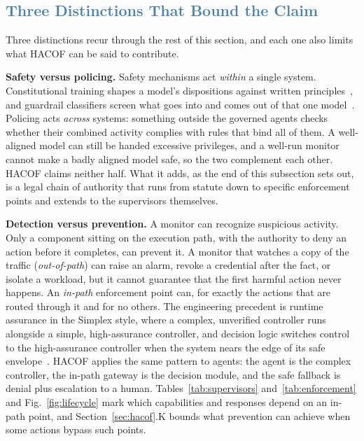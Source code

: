 \documentclass[journal]{IEEEtran}
\newcommand{\hacof}{HACOF}
\begin{document}
\subsection{\textcolor{steelblue}{Three Distinctions That Bound the Claim}}
\label{sec:hacof-b}

Three distinctions recur through the rest of this section, and each one also limits what \hacof{} can be said to contribute.

\textbf{Safety versus policing.} Safety mechanisms act \textit{within} a single system. Constitutional training shapes a model's dispositions against written principles~\cite{bai2022constitutional},
and guardrail classifiers screen what goes into and comes out of that one model~\cite{inan2023llamaguard,sharma2025constitutionalclassifiers}.
Policing acts \textit{across} systems: something outside the governed agents checks whether their combined activity complies with rules that bind all of them. A well-aligned model can still be handed excessive privileges, and a well-run monitor cannot make a badly aligned model safe, so the two complement each other. \hacof{} claims neither half. What it adds, as the end of this subsection sets out, is a legal chain of authority that runs from statute down to specific enforcement points and extends to the supervisors themselves.

\textbf{Detection versus prevention.} A monitor can recognize suspicious activity. Only a component sitting on the execution path, with the authority to deny an action before it completes, can prevent it. A monitor that watches a copy of the traffic (\textit{out-of-path}) can raise an alarm, revoke a credential after the fact, or isolate a workload, but it cannot guarantee that the first harmful action never happens. An \textit{in-path} enforcement point can, for exactly the actions that are routed through it and for no others. The engineering precedent is runtime assurance in the Simplex style, where a complex, unverified controller runs alongside a simple, high-assurance controller, and decision logic switches control to the high-assurance controller when the system nears the edge of its safe envelope~\cite{sha2001simplex}.
\hacof{} applies the same pattern to agents: the agent is the complex controller, the in-path gateway is the decision module, and the safe fallback is denial plus escalation to a human. Tables~\ref{tab:supervisors} and~\ref{tab:enforcement} and Fig.~\ref{fig:lifecycle} mark which capabilities and responses depend on an in-path point, and Section~\ref{sec:hacof}.K bounds what prevention can achieve when some actions bypass such points.
\end{document}
